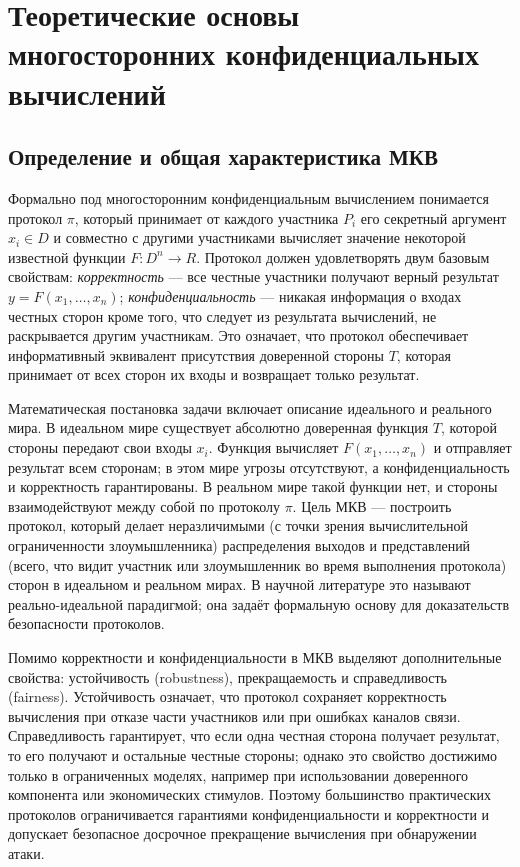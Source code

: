 \section{Теоретические основы многосторонних конфиденциальных вычислений}
\label{sec:theoretical-foundations}

\subsection{Определение и общая характеристика МКВ}

Формально под многосторонним конфиденциальным вычислением понимается протокол \(\pi\), который принимает от каждого участника \(P_{i}\) его секретный аргумент \(x_{i}\in D\) и совместно с другими участниками вычисляет значение некоторой известной функции \(F : D^{n}\to R\). Протокол должен удовлетворять двум базовым свойствам: \textit{корректность} --- все честные участники получают верный результат \(y=F(x_{1},\ldots,x_{n})\); \textit{конфиденциальность} --- никакая информация о входах честных сторон кроме того, что следует из результата вычислений, не раскрывается другим участникам. Это означает, что протокол обеспечивает информативный эквивалент присутствия доверенной стороны \(T\), которая принимает от всех сторон их входы и возвращает только результат.

Математическая постановка задачи включает описание идеального и реального мира. В идеальном мире существует абсолютно доверенная функция \(T\), которой стороны передают свои входы \(x_{i}\). Функция вычисляет \(F(x_{1},\ldots,x_{n})\) и отправляет результат всем сторонам; в этом мире угрозы отсутствуют, а конфиденциальность и корректность гарантированы. В реальном мире такой функции нет, и стороны взаимодействуют между собой по протоколу \(\pi\). Цель МКВ --- построить протокол, который делает неразличимыми (с точки зрения вычислительной ограниченности злоумышленника) распределения выходов и представлений (всего, что видит участник или злоумышленник во время выполнения протокола) сторон в идеальном и реальном мирах. В научной литературе это называют реально-идеальной парадигмой; она задаёт формальную основу для доказательств безопасности протоколов.

Помимо корректности и конфиденциальности в МКВ выделяют дополнительные свойства: устойчивость (robustness), прекращаемость и справедливость (fairness). Устойчивость означает, что протокол сохраняет корректность вычисления при отказе части участников или при ошибках каналов связи. Справедливость гарантирует, что если одна честная сторона получает результат, то его получают и остальные честные стороны; однако это свойство достижимо только в ограниченных моделях, например при использовании доверенного компонента или экономических стимулов. Поэтому большинство практических протоколов ограничивается гарантиями конфиденциальности и корректности и допускает безопасное досрочное прекращение вычисления при обнаружении атаки.

